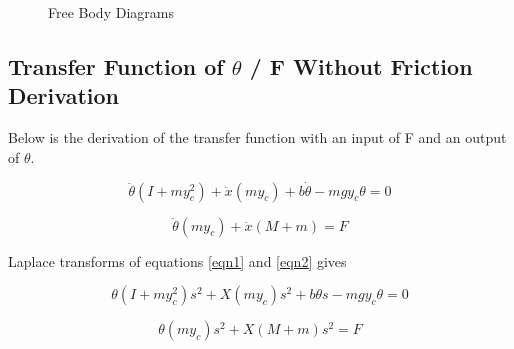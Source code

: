 \documentclass{article}
\begin{document}
\begin{figure}[H]
\centering
{}
\caption{Free Body Diagrams}
\end{figure}

\subsection{Transfer Function of $\theta$ / F Without Friction Derivation}
Below is the derivation of the transfer function with an input of F and an output of $\theta$.


\begin{equation} 
\label{eqn1}
\ddot \theta (I+m y_c^2)+\ddot x (m y_c)+b \dot \theta - m g y_c \theta = 0 
\end{equation}


\begin{equation} 
\label{eqn2}
\ddot \theta(m y_c) + \ddot x(M+m) = F
\end{equation}

Laplace transforms of equations \ref{eqn1} and \ref{eqn2} gives

\begin{equation} 
\label{eqn1l}
\theta (I+m y_c^2) s^2+ X (m y_c) s^2+b \theta s - m g y_c \theta = 0 
\end{equation}


\begin{equation}  
\label{eqn2l}
\theta (m y_c) s^2+ X (M+m) s^2= F
\end{equation}
\end{document}
